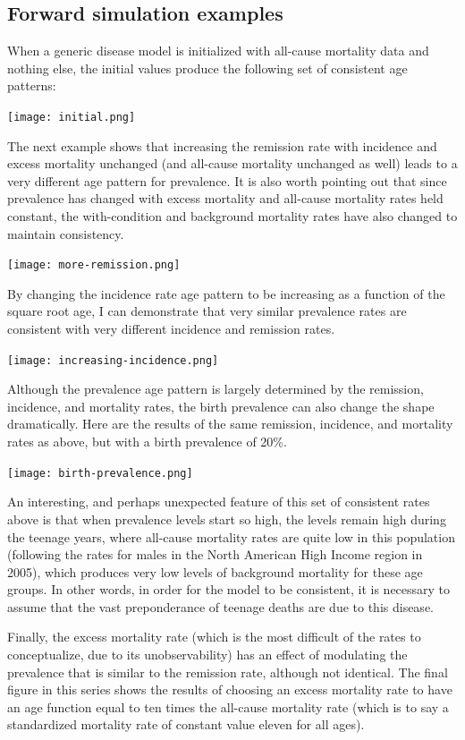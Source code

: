 \subsection{Forward simulation examples}

When a generic disease model is initialized with all-cause mortality
data and nothing else, the initial values produce the following set of
consistent age patterns:

\texttt{[image: initial.png]}

The next example shows that increasing the remission rate with
incidence and excess mortality unchanged (and all-cause mortality
unchanged as well) leads to a very different age pattern for
prevalence. It is also worth pointing out that since prevalence has
changed with excess mortality and all-cause mortality rates held
constant, the with-condition and background mortality rates have also
changed to maintain consistency.

\texttt{[image: more-remission.png]}

By changing the incidence rate age pattern to be increasing as a
function of the square root age, I can demonstrate that very similar
prevalence rates are consistent with very different incidence and
remission rates.

\texttt{[image: increasing-incidence.png]}

Although the prevalence age pattern is largely determined by the
remission, incidence, and mortality rates, the birth prevalence can
also change the shape dramatically.  Here are the results of the same
remission, incidence, and mortality rates as above, but with a birth
prevalence of 20\%.

\texttt{[image: birth-prevalence.png]}

An interesting, and perhaps unexpected feature of this set of
consistent rates above is that when prevalence levels start so high,
the levels remain high during the teenage years, where all-cause
mortality rates are quite low in this population (following the rates
for males in the North American High Income region in 2005), which
produces very low levels of background mortality for these age
groups. In other words, in order for the model to be consistent, it is
necessary to assume that the vast preponderance of teenage deaths are
due to this disease.

Finally, the excess mortality rate (which is the most difficult of the
rates to conceptualize, due to its unobservability) has an effect of
modulating the prevalence that is similar to the remission rate,
although not identical.  The final figure in this series shows the
results of choosing an excess mortality rate to have an age function
equal to ten times the all-cause mortality rate (which is to say a
standardized mortality rate of constant value eleven for all ages).

